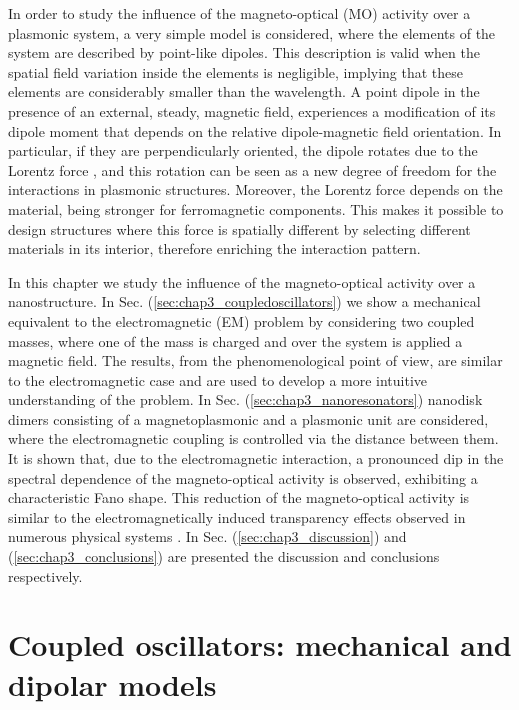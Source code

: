In order to study the influence of the magneto-optical (MO) activity over a plasmonic system, a very simple model is considered, where the elements of the system are described by point-like dipoles. This description is valid when the spatial field variation inside the elements is negligible, implying that these elements are considerably smaller than the wavelength. A point dipole in the presence of an external, steady, magnetic field, experiences a modification of its dipole moment that depends on the relative dipole-magnetic field orientation. In particular, if they are perpendicularly oriented, the dipole rotates due to the Lorentz force \cite{sepulveda2010plasmon}, and this rotation can be seen as a new degree of freedom for the interactions in plasmonic structures. Moreover, the Lorentz force depends on the material, being stronger for ferromagnetic components. This makes it possible to design structures where this force is spatially different by selecting different materials in its interior, therefore enriching the interaction pattern.

In this chapter we study the influence of the magneto-optical activity over a nanostructure. In Sec. (\ref{sec:chap3_coupledoscillators}) we show a mechanical equivalent to the electromagnetic (EM) problem by considering two coupled masses, where one of the mass is charged and over the system is applied a magnetic field. The results, from the phenomenological point of view, are similar to the electromagnetic case and are used to develop a more intuitive understanding of the problem. In Sec. (\ref{sec:chap3_nanoresonators}) nanodisk dimers consisting of a magnetoplasmonic and a plasmonic unit are considered, where the electromagnetic coupling is controlled via the distance between them. It is shown that, due to the electromagnetic interaction, a pronounced dip in the spectral dependence of the magneto-optical activity is observed, exhibiting a characteristic Fano shape. This reduction of the magneto-optical activity is similar to the electromagnetically induced transparency effects observed in numerous physical systems \cite{harris1990nonlinear,xu2006EIT, zhang2008plasmon, papasimakis2008metamaterial, liu2009plasmonic}.
In Sec. (\ref{sec:chap3_discussion}) and (\ref{sec:chap3_conclusions})  are presented the discussion and conclusions respectively.

\section{Coupled oscillators: mechanical and dipolar models\label{sec:chap3_coupledoscillators}}

